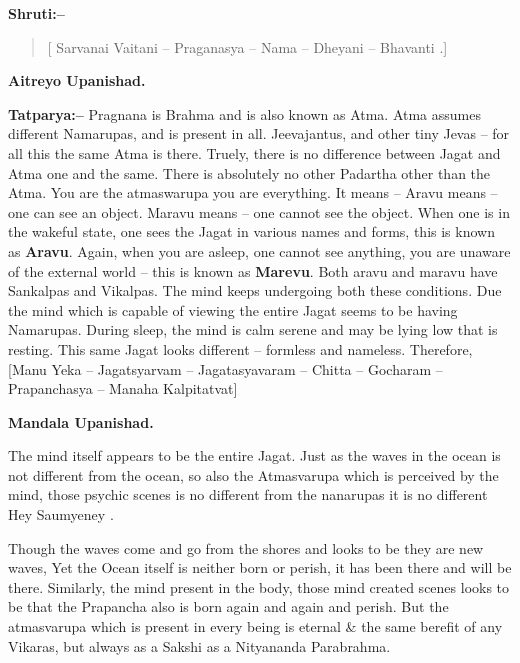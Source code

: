 \textbf{Shruti:–}

\begin{verse}
[ Sarvanai Vaitani – Praganasya – Nama – Dheyani – Bhavanti .]
\end{verse}

\begin{flushright}
\textbf{Aitreyo Upanishad.}
\end{flushright}

\textbf{Tatparya:–} Pragnana is Brahma and is also known as Atma. Atma assumes different Namarupas, and is present in all. Jeevajantus, and other tiny Jevas – for all this the same Atma is there. Truely, there is no difference between Jagat and Atma one and the same. There is absolutely no other Padartha other than the Atma. You are the atmaswarupa you are everything. It means – Aravu means – one can see an object. Maravu means – one cannot see the object. When one is in the wakeful state, one sees the Jagat in various names and forms, this is known as \textbf{Aravu}. Again, when you are asleep, one cannot see anything, you are unaware of the external world – this is known as \textbf{Marevu}. Both aravu and maravu have Sankalpas and Vikalpas. The mind keeps undergoing both these conditions. Due the mind which is capable of viewing the entire Jagat seems to be having Namarupas. During sleep, the mind is calm serene and may be lying low that is resting. This same Jagat looks different – formless and nameless. Therefore, [Manu Yeka – Jagatsyarvam – Jagatasyavaram – Chitta – Gocharam – Prapanchasya – Manaha Kalpitatvat]

\begin{flushright}
\textbf{Mandala Upanishad.}
\end{flushright}

The mind itself appears to be the entire Jagat. Just as the waves in the ocean is not different from the ocean, so also the Atmasvarupa which is perceived by the mind, those psychic scenes is no different from the nanarupas it is no different Hey  Saumyeney .

Though the waves come and go from the shores and looks to be they are new waves, Yet the Ocean itself is neither born or perish, it has been there and will be there. Similarly, the mind present in the body, those mind created scenes looks to be that the Prapancha also is born again and again and perish. But the atmasvarupa which is present in every being is eternal \& the same berefit of any Vikaras, but always as a Sakshi as a Nityananda Parabrahma.

